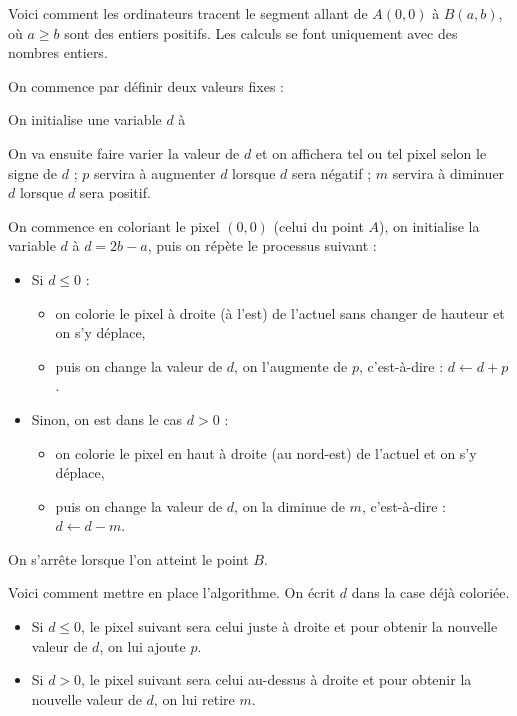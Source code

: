 \documentclass[class=report,crop=false, 12pt]{standalone}
\begin{document}
\begin{activite}

Voici comment les ordinateurs tracent le segment allant de $A(0,0)$ à $B(a,b)$, où $a \ge b$ sont des entiers positifs. Les calculs se font uniquement avec des nombres entiers.



On commence par définir deux valeurs fixes :


On initialise une variable $d$ à 


On va ensuite faire varier la valeur de $d$ et on affichera tel ou tel pixel selon le signe de $d$ ;
$p$ servira à augmenter $d$ lorsque $d$ sera négatif ;
$m$ servira à diminuer $d$ lorsque $d$ sera positif.

\bigskip

On commence en coloriant le pixel $(0,0)$ (celui du point $A$), on initialise la variable $d$ à $d=2b-a$, puis on répète le processus suivant :
\begin{itemize}
  \item Si $d \le 0$ :
  \begin{itemize}
    \item on colorie le pixel à droite (à l'est) de l'actuel sans changer de hauteur et on s'y déplace, 
    \item puis on change la valeur de $d$, on l'augmente de $p$, c'est-à-dire : $d \leftarrow d + p$.
  \end{itemize}
  \item Sinon, on est dans le cas $d > 0$ :
  \begin{itemize}
    \item on colorie le pixel en haut à droite (au nord-est) de l'actuel et on s'y déplace, 
    \item puis on change la valeur de $d$, on la diminue de $m$, c'est-à-dire : $d \leftarrow d - m$.
  \end{itemize}  
\end{itemize} 



On s'arrête lorsque l'on atteint le point $B$.

Voici comment mettre en place l'algorithme. On écrit $d$ dans la case déjà coloriée.
\begin{itemize}
  \item Si $d \le 0$, le pixel suivant sera celui juste à droite et pour obtenir la nouvelle valeur de $d$, on lui ajoute $p$.
  \item Si $d > 0$, le pixel suivant sera celui au-dessus à droite et pour obtenir la nouvelle valeur de $d$, on lui retire $m$.
\end{itemize}


\end{activite}
\end{document}
